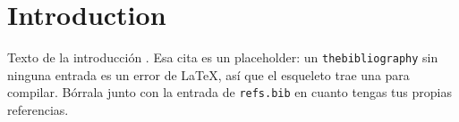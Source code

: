 %
%
%
%
%

\section{Introduction}
\label{sec:introduction}

Texto de la introducción \citep{baker66}. Esa cita es un placeholder: un
\texttt{thebibliography} sin ninguna entrada es un error de LaTeX, así que el
esqueleto trae una para compilar. Bórrala junto con la entrada de
\texttt{refs.bib} en cuanto tengas tus propias referencias.

